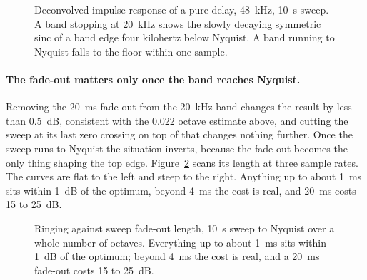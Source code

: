 \begin{figure}[ht]
\caption{Deconvolved impulse response of a pure delay, \SI{48}{\kilo\hertz},
\SI{10}{\second} sweep. A band stopping at \SI{20}{\kilo\hertz} shows the slowly
decaying symmetric sinc of a band edge four kilohertz below Nyquist. A band
running to Nyquist falls to the floor within one sample.}
\label{fig:sweepir}
\end{figure}

\paragraph{The fade-out matters only once the band reaches Nyquist.} Removing the \SI{20}{\milli\second} fade-out from the \SI{20}{\kilo\hertz} band changes the result by less than \SI{0.5}{\dB}, consistent with the \num{0.022} octave estimate above, and cutting the sweep at its last zero crossing on top of that changes nothing further. Once the sweep runs to Nyquist the situation inverts, because the fade-out becomes the only thing shaping the top edge. Figure~\ref{fig:sweepfade} scans its length at three sample rates. The curves are flat to the left and steep to the right. Anything up to about \SI{1}{\milli\second} sits within \SI{1}{\dB} of the optimum, beyond \SI{4}{\milli\second} the cost is real, and \SI{20}{\milli\second} costs \SI{15}{} to \SI{25}{\dB}.

\begin{figure}[ht]
\centering
{}
\caption{Ringing against sweep fade-out length, \SI{10}{\second} sweep to
Nyquist over a whole number of octaves. Everything up to about
\SI{1}{\milli\second} sits within \SI{1}{\dB} of the optimum; beyond
\SI{4}{\milli\second} the cost is real, and a \SI{20}{\milli\second} fade-out
costs \SI{15}{} to \SI{25}{\dB}.}
\label{fig:sweepfade}
\end{figure}

